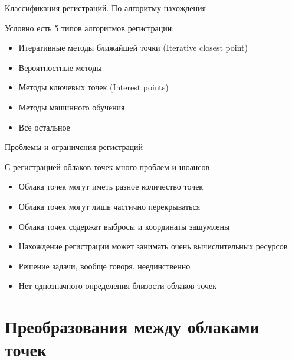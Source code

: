 \documentclass[6pt,pdf,utf8,russian]{beamer}
\begin{document}
\begin{frame}[fragile]{Классификация регистраций. По алгоритму нахождения}
    \begin{block}{}
        Условно есть 5 типов алгоритмов регистрации:
        \begin{itemize}
            \item Итеративные методы ближайшей точки (Iterative closest point)
            \item Вероятностные методы
            \item Методы ключевых точек (Interest points)
            \item Методы машинного обучения
            \item Все остальное
        \end{itemize}
    \end{block}
\end{frame}

\begin{frame}[fragile]{Проблемы и ограничения регистраций}
    \begin{block}{}
        С регистрацией облаков точек много проблем и нюансов
        \begin{itemize}
            \item Облака точек могут иметь разное количество точек
            \item Облака точек могут лишь частично перекрываться
            \item Облака точек содержат выбросы и координаты зашумлены
            \item Нахождение регистрации может занимать очень вычислительных ресурсов
            \item Решение задачи, вообще говоря, неединственно
            \item Нет однозначного определения близости облаков точек
        \end{itemize}
    \end{block}
\end{frame}

\section{Преобразования между облаками точек}
\end{document}
